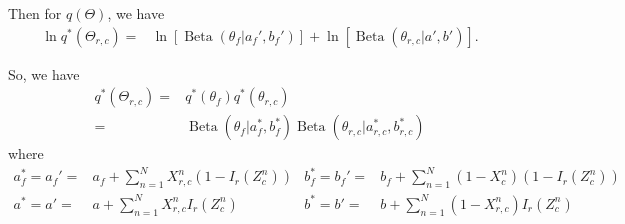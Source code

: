 \documentclass[11pt]{extarticle}
\newcommand{\E}{\mathbb{E}}
\newcommand{\0}{\mathbf{0}}
\renewcommand{\(}{\left(}
\renewcommand{\)}{\right)}
\DeclareMathOperator{\Beta}{Beta}
\theoremstyle{definition}
\begin{document}
\par Then for $q(\Theta)$, we have
\begin{align*}
	\ln q^{*}(\Theta_{r,c}) =& \ln\left[\Beta(\theta_{f} \vert a_{f}', b_{f}')\right] + \ln\left[\Beta(\theta_{r,c}\vert a', b')\right].
\end{align*}
\par So, we have 
\begin{align*}
	q^{*}(\Theta_{r,c}) =& q^{*}(\theta_{f})q^{*}(\theta_{r,c}) \\
	=& \Beta(\theta_{f} \vert a_{f}^{*}, b_{f}^{*}) \Beta(\theta_{r,c} \vert a_{r,c}^{*}, b_{r,c}^{*})
\end{align*}
where
\begin{align*}
	a_{f}^{*} = a_{f}' 	=& a_{f} + \sum_{n=1}^{N} X^{n}_{r,c}(1-I_{r}(Z^{n}_{c})) &
	b_{f}^{*} = b_{f}' 	=& b_{f} + \sum_{n=1}^{N} (1-X^{n}_{c})(1-I_{r}(Z^{n}_{c})) \\
	a^{*} = a' 		=& a + \sum_{n=1}^{N} X^{n}_{r,c}I_{r}(Z^{n}_{c}) &
	b^{*} = b' 		=& b + \sum_{n=1}^{N} (1 - X^{n}_{r,c})I_{r}(Z^{n}_{c})
\end{align*}


\newpage


\end{document}
